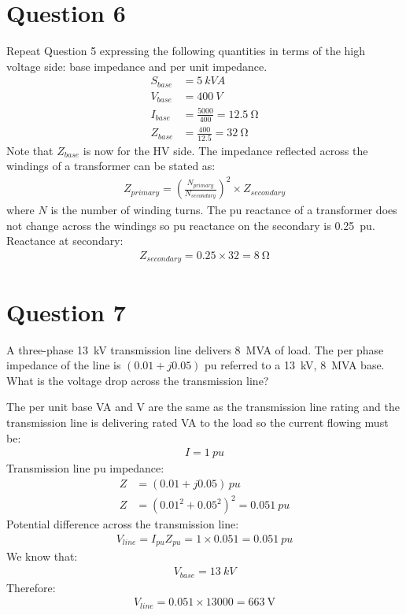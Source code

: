 \section{Question 6}
Repeat Question 5 expressing the following quantities in terms of the high voltage side: base impedance and per unit impedance.
\begin{align}
    S_{base} & = \SI{5}{kVA}                        \\
    V_{base} & = \SI{400}{V}                        \\
    I_{base} & = \frac{5000}{400} = \SI{12.5}{\ohm} \\
    Z_{base} & = \frac{400}{12.5} = \SI{32}{\ohm}
\end{align}
Note that $Z_{base}$ is now for the HV side. The impedance reflected across the windings of a transformer can be stated as:
\begin{gather}
    Z_{primary} = \left(\frac{N_{primary}}{N_{secondary}}\right)^2\times Z_{secondary}
\end{gather}
where $N$ is the number of winding turns. The pu reactance of a transformer does not change across the windings so pu reactance on the secondary is \SI{0.25}{pu}. Reactance at secondary:
\begin{gather}
    Z_{secondary} = 0.25 \times 32 = \SI{8}{\ohm}
\end{gather}
\section{Question 7}
A three-phase \SI{13}{\kilo\volt} transmission line delivers \SI{8}{MVA} of load. The per phase impedance of the line is $\left(0.01+j0.05\right)$ pu referred to a \SI{13}{\kilo\volt}, \SI{8}{MVA} base. What is the voltage drop across the transmission line?

The per unit base VA and V are the same as the transmission line rating and the transmission line is delivering rated VA to the load so the current flowing must be:
\begin{gather}
    I = \SI{1}{pu}
\end{gather}
Transmission line pu impedance:
\begin{align}
    Z & = \left(0.01+j0.05\right)\, \si{pu}             \\
    Z & = \left(0.01^2+0.05^2\right)^2 = \SI{0.051}{pu}
\end{align}
Potential difference across the transmission line:
\begin{gather}
    V_{line} = I_{pu}Z_{pu} = 1\times 0.051 = \SI{0.051}{pu}
\end{gather}
We know that:
\begin{gather}
    V_{base} = \SI{13}{kV}
\end{gather}
Therefore:
\begin{gather}
    V_{line} = 0.051\times 13000 = \SI{663}{\volt}
\end{gather}
